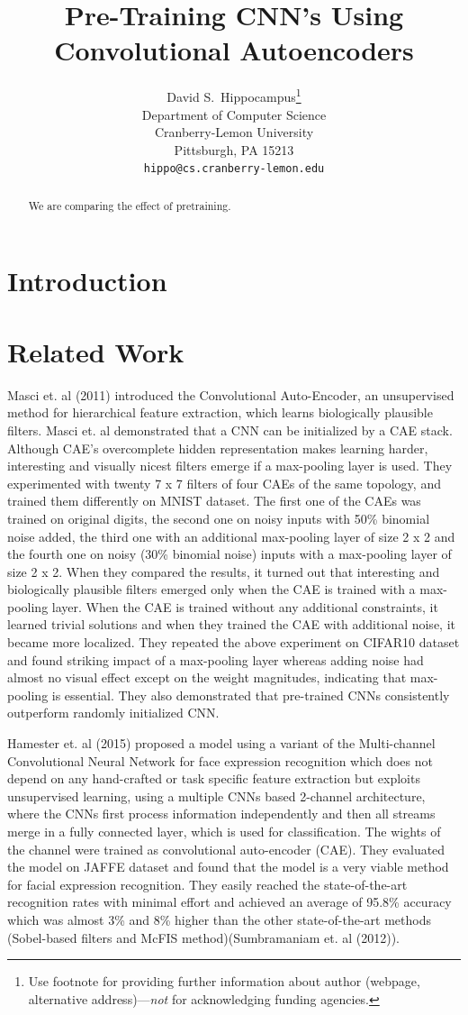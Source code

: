 \documentclass[draft]{article}
\title{Pre-Training CNN's Using Convolutional Autoencoders}
\author{
  David S.~Hippocampus\thanks{Use footnote for providing further
    information about author (webpage, alternative
    address)---\emph{not} for acknowledging funding agencies.} \\
  Department of Computer Science\\
  Cranberry-Lemon University\\
  Pittsburgh, PA 15213 \\
  \texttt{hippo@cs.cranberry-lemon.edu} \\
}
\begin{document}

\maketitle

\begin{abstract}
  We are comparing the effect of pretraining.
\end{abstract}

\section{Introduction}
\section{Related Work}
Masci et. al (2011) introduced the Convolutional Auto-Encoder, an unsupervised method for hierarchical feature extraction, which learns biologically plausible filters. Masci et. al demonstrated that a CNN can be initialized by a CAE stack. Although CAE’s overcomplete hidden representation makes learning harder,  interesting and visually nicest filters emerge if a max-pooling layer is used. They experimented with twenty 7 x 7 filters of four CAEs of the same topology, and trained them differently on MNIST dataset. The first one of the CAEs was trained on original digits, the second one on noisy inputs with 50\% binomial noise added, the third one with an additional max-pooling layer of size 2 x 2 and the fourth one on noisy (30\% binomial noise) inputs with a max-pooling layer of size 2 x 2. When they compared the results, it turned out that interesting and biologically plausible filters emerged only when the CAE is trained with a max-pooling layer. When the CAE is trained without any additional constraints, it learned trivial solutions and when they trained the CAE with additional noise, it became more localized. They repeated the above experiment on CIFAR10 dataset and found striking impact of a max-pooling layer whereas adding noise had almost no visual effect except on the weight magnitudes, indicating that max-pooling is essential. They also demonstrated that pre-trained CNNs consistently outperform randomly initialized CNN.

Hamester et. al (2015) proposed a model using a variant of the Multi-channel Convolutional Neural Network for face expression recognition which does not depend on any hand-crafted or task specific feature extraction but exploits unsupervised learning, using a multiple CNNs
based 2-channel architecture, where the CNNs first process information independently and then all streams merge in a fully connected layer, which is used for classification. The wights of the channel were trained as convolutional auto-encoder (CAE). They evaluated the model on JAFFE dataset and found that the model is a very viable method for facial expression recognition. They easily reached the state-of-the-art recognition rates with minimal effort and achieved an average of 95.8\% accuracy which was almost 3\% and 8\% higher than the other state-of-the-art methods (Sobel-based filters and McFIS method)(Sumbramaniam et. al (2012)).
\end{document}
